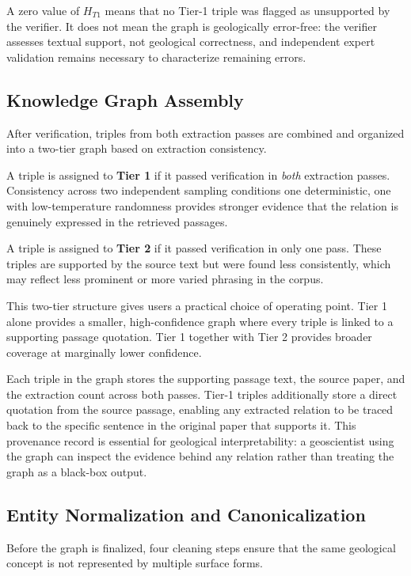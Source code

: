 \documentclass[10pt]{article}
\begin{document}
A zero value of $H_{T1}$ means that no Tier-1 triple was
flagged as unsupported by the verifier.
It does not mean the graph is geologically error-free:
the verifier assesses textual support, not geological
correctness, and independent expert validation remains
necessary to characterize remaining errors.

\subsection{Knowledge Graph Assembly}
\label{sec:tiered}

After verification, triples from both extraction passes are
combined and organized into a two-tier graph based on
extraction consistency.

A triple is assigned to \textbf{Tier 1} if it passed
verification in \emph{both} extraction passes.
Consistency across two independent sampling conditions 
one deterministic, one with low-temperature randomness 
provides stronger evidence that the relation is genuinely
expressed in the retrieved passages.

A triple is assigned to \textbf{Tier 2} if it passed
verification in only one pass.
These triples are supported by the source text but were
found less consistently, which may reflect less prominent
or more varied phrasing in the corpus.

This two-tier structure gives users a practical choice of
operating point.
Tier 1 alone provides a smaller, high-confidence graph where
every triple is linked to a supporting passage quotation.
Tier 1 together with Tier 2 provides broader coverage at
marginally lower confidence.

Each triple in the graph stores the supporting passage text,
the source paper, and the extraction count across both passes.
Tier-1 triples additionally store a direct quotation from
the source passage, enabling any extracted relation to be
traced back to the specific sentence in the original paper
that supports it.
This provenance record is essential for geological
interpretability: a geoscientist using the graph can inspect
the evidence behind any relation rather than treating the
graph as a black-box output.

\subsection{Entity Normalization and Canonicalization}
\label{sec:canonicalization}

Before the graph is finalized, four cleaning steps ensure
that the same geological concept is not represented by
multiple surface forms.
\end{document}
